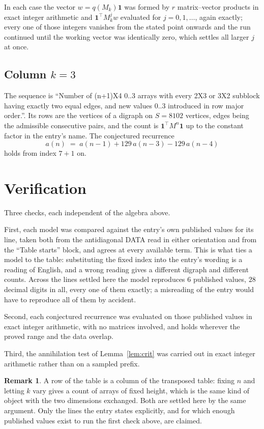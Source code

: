 \documentclass[11pt,a4paper]{article}
\theoremstyle{plain}
\theoremstyle{definition}
\newtheorem{remark}[theorem]{Remark}
\begin{document}
In each case the vector $w=q(M_k)\mathbf{1}$ was formed by $r$ matrix--vector products in
exact integer arithmetic and $\mathbf{1}^{\!\top}M_k^{j}w$ evaluated for $j=0,1,\dots$,
again exactly; every one of those integers vanishes from the stated point onwards and the run
continued until the working vector was identically zero, which settles all larger $j$ at once.

\subsection*{Column $k$$=3$}
The sequence is ``Number of (n+1)X4 0..3 arrays with every 2X3 or 3X2 subblock having exactly two equal edges, and new values 0..3 introduced in row major order.''. Its rows are the vertices of a digraph on
$S=8102$ vertices, edges being the admissible consecutive pairs, and the count is
$\mathbf{1}^{\!\top}M^{n}\mathbf{1}$ up to the constant factor in the entry's name.
The conjectured recurrence
\[
a(n)\;=\;a(n-1) + 129\,a(n-3) - 129\,a(n-4)
\]
holds from index $7+1$ on.

\section{Verification}

Three checks, each independent of the algebra above.

First, each model was compared against the entry's own published values for its line, taken
both from the antidiagonal DATA read in either orientation and from the ``Table starts''
block, and agrees at every available term. This is what ties a model to the table:
substituting the fixed index into the entry's wording is a reading of English, and a wrong
reading gives a different digraph and different counts. Across the lines settled here the
model reproduces $6$ published values, $28$ decimal digits in all, every one of
them exactly; a misreading of the entry would have to reproduce all of them by accident.

Second, each conjectured recurrence was evaluated on those published values in exact
integer arithmetic, with no matrices involved, and holds wherever the proved range and the
data overlap.

Third, the annihilation test of Lemma~\ref{lem:crit} was carried out in exact integer
arithmetic rather than on a sampled prefix.

\begin{remark}
A row of the table is a column of the transposed table: fixing $n$ and letting $k$ vary gives a
count of arrays of fixed height, which is the same kind of object with the two dimensions
exchanged. Both are settled here by the same argument. Only the lines the entry states
explicitly, and for which enough published values exist to run the first check above, are
claimed.
\end{remark}
\end{document}
